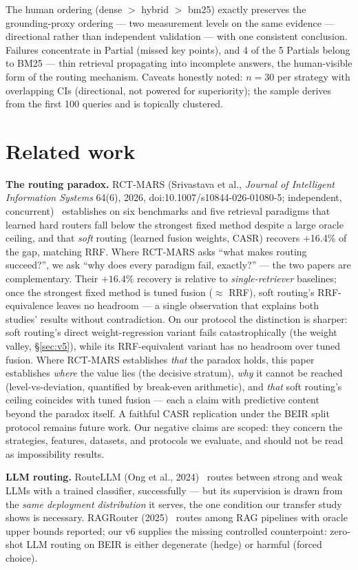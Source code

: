 \documentclass[11pt]{article}
\begin{document}
The human ordering (dense $>$ hybrid $>$ bm25) exactly preserves the grounding-proxy ordering --- two measurement levels on the same evidence --- directional rather than independent validation --- with one consistent conclusion. Failures concentrate in Partial (missed key points), and 4 of the 5 Partials belong to BM25 --- thin retrieval propagating into incomplete answers, the human-visible form of the routing mechanism. Caveats honestly noted: $n{=}30$ per strategy with overlapping CIs (directional, not powered for superiority); the sample derives from the first 100 queries and is topically clustered.

\section{Related work}\label{sec:related}
\textbf{The routing paradox.} RCT-MARS (Srivastava et al., \emph{Journal of Intelligent Information Systems} 64(6), 2026, doi:10.1007/s10844-026-01080-5; independent, concurrent)~\cite{rctmars} establishes on six benchmarks and five retrieval paradigms that learned hard routers fall below the strongest fixed method despite a large oracle ceiling, and that \emph{soft} routing (learned fusion weights, CASR) recovers +16.4\% of the gap, matching RRF. Where RCT-MARS asks ``what makes routing succeed?'', we ask ``why does every paradigm fail, exactly?'' --- the two papers are complementary. Their $+16.4\%$ recovery is relative to \emph{single-retriever} baselines; once the strongest fixed method is tuned fusion (${\approx}$ RRF), soft routing's RRF-equivalence leaves no headroom --- a single observation that explains both studies' results without contradiction. On our protocol the distinction is sharper: soft routing's direct weight-regression variant fails catastrophically (the weight valley, \S\ref{sec:v5}), while its RRF-equivalent variant has no headroom over tuned fusion. Where RCT-MARS establishes \emph{that} the paradox holds, this paper establishes \emph{where} the value lies (the decisive stratum), \emph{why} it cannot be reached (level-vs-deviation, quantified by break-even arithmetic), and \emph{that} soft routing's ceiling coincides with tuned fusion --- each a claim with predictive content beyond the paradox itself. A faithful CASR replication under the BEIR split protocol remains future work. Our negative claims are scoped: they concern the strategies, features, datasets, and protocols we evaluate, and should not be read as impossibility results.

\textbf{LLM routing.} RouteLLM (Ong et al., 2024)~\cite{routellm} routes between strong and weak LLMs with a trained classifier, successfully --- but its supervision is drawn from the \emph{same deployment distribution} it serves, the one condition our transfer study shows is necessary. RAGRouter (2025)~\cite{ragrouter} routes among RAG pipelines with oracle upper bounds reported; our v6 supplies the missing controlled counterpoint: zero-shot LLM routing on BEIR is either degenerate (hedge) or harmful (forced choice).
\end{document}
